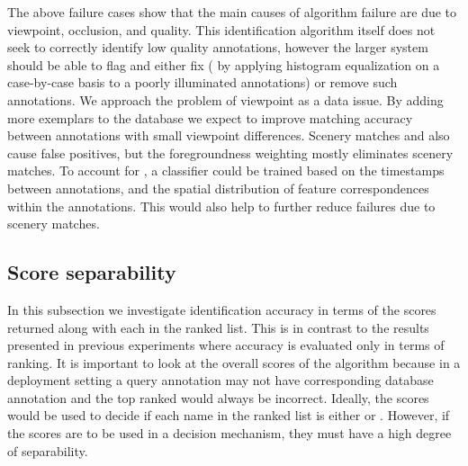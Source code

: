         The above failure cases show that the main causes of algorithm
          failure are due to viewpoint, occlusion, and quality.
        This identification algorithm itself does not seek to correctly
          identify low quality annotations, however the larger system
          should be able to flag and either fix (\eg{} by applying
          histogram equalization on a case-by-case basis to a poorly
          illuminated annotations) or remove such annotations.
        We approach the problem of viewpoint as a data issue.
        By adding more exemplars to the database we expect to improve
          matching accuracy between annotations with small viewpoint
          differences.
        Scenery matches and \photobombings{} also cause false
          positives, but the foregroundness weighting mostly eliminates
          scenery matches.
        To account for \photobombings{}, a classifier could be trained
          based on the timestamps between annotations, and the spatial
          distribution of feature correspondences within the annotations.
        This would also help to further reduce failures due to scenery
          matches.
        


    \subsection{Score separability}\label{sub:exptsep}  

        In this subsection we investigate identification accuracy in
          terms of the scores returned along with each \name{} in the
          ranked list.
        This is in contrast to the results presented in previous
          experiments where accuracy is evaluated only in terms of
          ranking.
        It is important to look at the overall scores of the algorithm
          because in a deployment setting a query annotation may not have
          corresponding \groundtrue{} database annotation and the top
          ranked \name{} would always be incorrect.
        Ideally, the scores would be used to decide if each name in the
          ranked list is either \groundtrue{} or \groundfalse{}.
        However, if the scores are to be used in a decision mechanism,
          they must have a high degree of separability.

